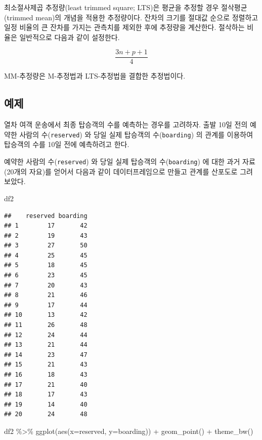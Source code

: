\documentclass[
  10pt,
]{book}
\newenvironment{Shaded}{\begin{snugshade}}{\end{snugshade}}
\newcommand{\AttributeTok}[1]{\textcolor[rgb]{0.77,0.63,0.00}{#1}}
\newcommand{\FunctionTok}[1]{\textcolor[rgb]{0.00,0.00,0.00}{#1}}
\newcommand{\NormalTok}[1]{#1}
\newcommand{\SpecialCharTok}[1]{\textcolor[rgb]{0.00,0.00,0.00}{#1}}
\theoremstyle{definition}
\theoremstyle{definition}
\theoremstyle{definition}
\theoremstyle{definition}
\theoremstyle{remark}
\begin{document}
최소절사제곱 추정량(least trimmed square; LTS)은 평균을 추정할 경우 절삭평균(trimmed mean)의 개념을 적용한 추정량이다. 잔차의 크기를 절대값 순으로 정렬하고 일정 비율의 큰 잔차를 가지는 관측치를 제외한 후에 추정량을 계산한다. 절삭하는 비율은 일반적으로 다음과 같이 설정한다.

\[  \frac{3n+p+1}{4} \]

MM-추정량은 M-추정법과 LTS-추정법을 결합한 추정법이다.

\hypertarget{uxc608uxc81c-1}{%
\subsection{예제}\label{uxc608uxc81c-1}}

열차 여객 운송에서 최종 탑승객의 수를 예측하는 경우를 고려하자. 출발 10일 전의 예약한 사람의 수(\texttt{reserved}) 와 당일 실제 탑승객의 수(\texttt{boarding}) 의 관계를 이용하여 탑승객의 수를 10일 전에 예측하려고 한다.

예약한 사람의 수(\texttt{reserved}) 와 당일 실제 탑승객의 수(\texttt{boarding}) 에 대한 과거 자료(20개의 자요)를 얻어서 다음과 같이 데이터프레임으로 만들고 관계를 산포도로 그려 보았다.

\begin{Shaded}
\begin{Highlighting}[]
\NormalTok{df2}
\end{Highlighting}
\end{Shaded}

\begin{verbatim}
##    reserved boarding
## 1        17       42
## 2        19       43
## 3        27       50
## 4        25       45
## 5        18       45
## 6        23       45
## 7        20       43
## 8        21       46
## 9        17       44
## 10       13       42
## 11       26       48
## 12       24       44
## 13       21       44
## 14       23       47
## 15       21       43
## 16       18       43
## 17       21       40
## 18       17       43
## 19       14       40
## 20       24       48
\end{verbatim}

\begin{Shaded}
\begin{Highlighting}[]
\NormalTok{df2 }\SpecialCharTok{\%\textgreater{}\%} \FunctionTok{ggplot}\NormalTok{(}\FunctionTok{aes}\NormalTok{(}\AttributeTok{x=}\NormalTok{reserved, }\AttributeTok{y=}\NormalTok{boarding)) }\SpecialCharTok{+} \FunctionTok{geom\_point}\NormalTok{() }\SpecialCharTok{+} \FunctionTok{theme\_bw}\NormalTok{()}
\end{Highlighting}
\end{Shaded}
\end{document}
